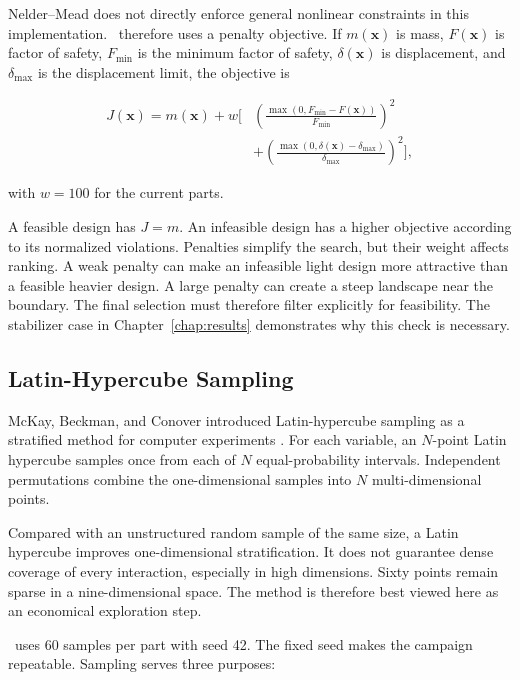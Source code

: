 Nelder--Mead does not directly enforce general nonlinear constraints in this
implementation. \NEMO\ therefore uses a penalty objective. If
$m(\mathbf{x})$ is mass, $F(\mathbf{x})$ is factor of safety,
$F_{\min}$ is the minimum factor of safety, $\delta(\mathbf{x})$ is
displacement, and $\delta_{\max}$ is the displacement limit, the objective is

\begin{equation}
\begin{split}
J(\mathbf{x})=m(\mathbf{x})+w\Bigg[
&\left(
\frac{\max(0,F_{\min}-F(\mathbf{x}))}{F_{\min}}
\right)^2\\
&+\left(
\frac{\max(0,\delta(\mathbf{x})-\delta_{\max})}
{\delta_{\max}}
\right)^2
\Bigg],
\end{split}
\label{eq:penalty-objective}
\end{equation}

with $w=100$ for the current parts.

A feasible design has $J=m$. An infeasible design has a higher objective
according to its normalized violations. Penalties simplify the search, but
their weight affects ranking. A weak penalty can make an infeasible light
design more attractive than a feasible heavier design. A large penalty can
create a steep landscape near the boundary. The final selection must therefore
filter explicitly for feasibility. The stabilizer case in
Chapter~\ref{chap:results} demonstrates why this check is necessary.

\subsection{Latin-Hypercube Sampling}
\label{sec:lhs-review}

McKay, Beckman, and Conover introduced Latin-hypercube sampling as a stratified
method for computer experiments \cite{mckay1979}. For each variable, an
$N$-point Latin hypercube samples once from each of $N$ equal-probability
intervals. Independent permutations combine the one-dimensional samples into
$N$ multi-dimensional points.

Compared with an unstructured random sample of the same size, a Latin
hypercube improves one-dimensional stratification. It does not guarantee dense
coverage of every interaction, especially in high dimensions. Sixty points
remain sparse in a nine-dimensional space. The method is therefore best
viewed here as an economical exploration step.

\NEMO\ uses 60 samples per part with seed 42. The fixed seed makes the
campaign repeatable. Sampling serves three purposes:

